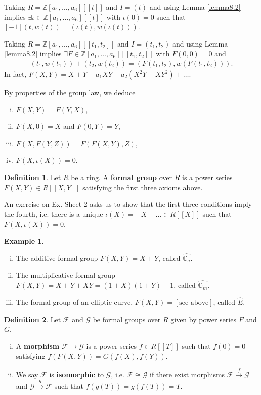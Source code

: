 \documentclass{article}
\theoremstyle{definition}
\newtheorem{example}{Example}[section]
\newtheorem{defn}{Definition}[section]
\begin{document}
Taking $R = \mathbb{Z}[a_1,\ldots,a_6][[t]]$ and $I = (t)$ and using Lemma \ref{lemma8.2} implies $\exists \iota \in \mathbb{Z}[a_1,\ldots,a_6][[t]]$ with $\iota(0)=0$ such that $[-1](t,w(t)) = (\iota(t), w(\iota(t)))$.
\vspace{1mm}
 
Taking $R = \mathbb{Z}[a_1,\ldots,a_6][[t_1,t_2]]$ and $I = (t_1,t_2)$ and using Lemma \ref{lemma8.2} implies $\exists F \in \mathbb{Z}[a_1,\ldots,a_6][[t_1,t_2]]$ with $F(0,0)=0$ and 
\begin{align*}
    (t_1,w(t_1)) + (t_2,w(t_2)) = (F(t_1,t_2), w(F(t_1,t_2))).
\end{align*}
In fact, $F(X,Y) = X + Y - a_1XY - a_2(X^2Y + XY^2) + \ldots$.
\vspace{1mm}
 
By properties of the group law, we deduce
\begin{enumerate}[(i)]
    \item $F(X,Y)=F(Y,X)$,
    \item $F(X,0)=X$ and $F(0,Y)=Y$,
    \item $F(X,F(Y,Z)) = F(F(X,Y),Z)$,
    \item $F(X,\iota(X))=0$.
\end{enumerate}
\begin{defn}\label{defn8.4}
    Let $R$ be a ring. A \textbf{formal group} over $R$ is a power series $F(X,Y) \in R[[X,Y]]$ satisfying the first three axioms above.
\end{defn}
An exercise on Ex. Sheet 2 asks us to show that the first three conditions imply the fourth, i.e. there is a unique $\iota(X) = -X + \ldots \in R[[X]]$ such that $F(X,\iota(X))=0$.
\begin{example}
    \begin{enumerate}[(i)]
        \item The additive formal group $F(X,Y)=X+Y$, called $\widehat{\mathbb{G}_a}$.
        \item The multiplicative formal group $F(X,Y) = X + Y +XY = (1+X)(1+Y)-1$, called $\widehat{\mathbb{G}_m}$.
        \item The formal group of an elliptic curve, $F(X,Y) = [\text{see above}]$, called $\widehat{E}$.
    \end{enumerate}
\end{example}
\begin{defn}
    Let $\mathcal{F}$ and $\mathcal{G}$ be formal groups over $R$ given by power series $F$ and $G$.
    \begin{enumerate}[(i)]
        \item A \textbf{morphism} $\mathcal{F} \to \mathcal{G}$ is a power series $f \in R[[T]]$ such that $f(0)=0$ satisfying $f(F(X,Y))=G(f(X),f(Y))$.
        \item We say $\mathcal{F}$ is \textbf{isomorphic} to $\mathcal{G}$, i.e. $\mathcal{F}\cong \mathcal{G}$ if there exist morphisms $\mathcal{F} \stackrel{f}{\to} \mathcal{G}$ and $\mathcal{G} \stackrel{g}{\to} \mathcal{F}$ such that $f(g(T))=g(f(T))=T$.
    \end{enumerate}
\end{defn}
\end{document}
